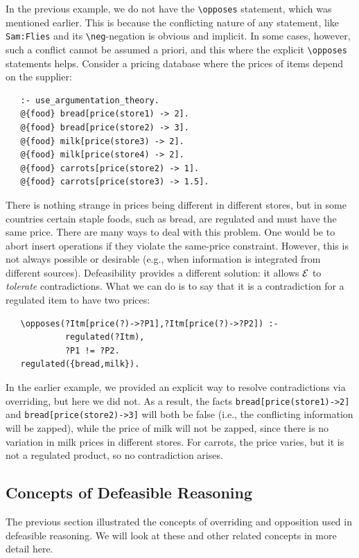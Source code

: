 \documentclass[11pt]{article}
\newcommand{\ERGO}{\mbox{\ensuremath{\cal{E}}\smaller{{\sc{RGO}}}}\xspace}
\newcommand{\FLSYSTEM}{\ERGO}
\newcommand{\bs}{\textbackslash}
\newcommand{\RULELOGNEG}{{\texttt{{\bs}neg}}\xspace}
\begin{document}
In the previous example, we do not have the \texttt{\bs{}opposes}
statement, which was mentioned earlier. This is because the conflicting
nature of any statement, like \texttt{Sam:Flies} and its
\texttt{\RULELOGNEG}-negation is obvious and implicit. In some cases, however, such a
conflict cannot be assumed a priori, and this where the explicit
\texttt{\bs{}opposes} statements helps.
Consider a pricing database where the prices of items depend on the supplier:
\begin{verbatim}
   :- use_argumentation_theory.
   @{food} bread[price(store1) -> 2].
   @{food} bread[price(store2) -> 3].
   @{food} milk[price(store3) -> 2].
   @{food} milk[price(store4) -> 2].
   @{food} carrots[price(store2) -> 1].
   @{food} carrots[price(store3) -> 1.5].
\end{verbatim}
There is nothing strange in prices being different in different stores, but
in some countries certain staple foods, such as bread, are regulated and
must have the same price. There are many ways to deal with this problem.
One would be to abort insert operations if they violate the same-price
constraint. However, this is not always possible or desirable (e.g., when
information is integrated from different sources). Defeasibility provides a
different solution: it allows \FLSYSTEM to \emph{tolerate} contradictions.
What we can do is to say that it is a contradiction for
a regulated item to have two prices:
\begin{verbatim}
   \opposes(?Itm[price(?)->?P1],?Itm[price(?)->?P2]) :-
            regulated(?Itm),
            ?P1 != ?P2.
   regulated({bread,milk}).
\end{verbatim}
In the earlier example, we provided an explicit way to resolve contradictions
via overriding, but
here we did not. As a result, the facts \texttt{bread[price(store1)->2]} and
\texttt{bread[price(store2)->3]} will both be false (i.e., the conflicting
information will be zapped), while the price of milk will not be zapped,
since there is no variation in milk prices in different stores. For
carrots, the price varies, but it is not a regulated product, so no
contradiction arises.

\subsection{Concepts of Defeasible Reasoning}

The previous section illustrated the concepts of overriding and opposition
used in defeasible reasoning. We will look at these and other related
concepts in more detail here.
\end{document}
